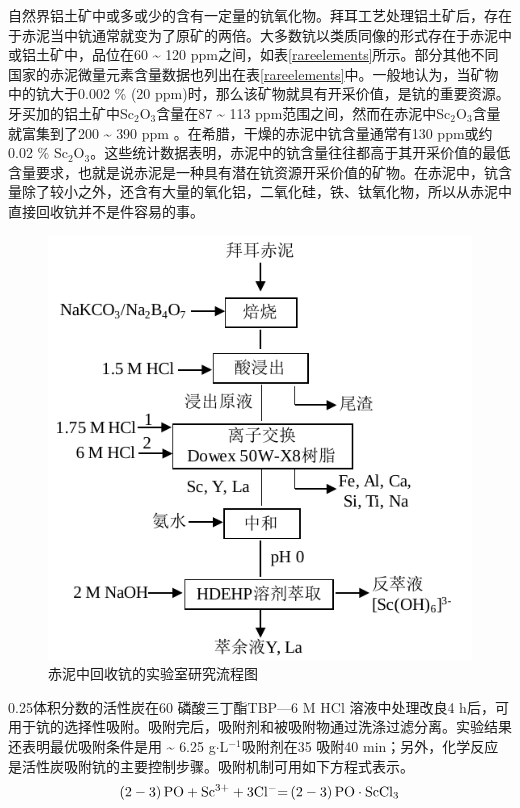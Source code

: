 自然界铝土矿中或多或少的含有一定量的钪氧化物。拜耳工艺处理铝土矿后，存在于赤泥当中钪通常就变为了原矿的两倍\cite{ochsenkuhn1994direct}。大多数钪以类质同像的形式存在于赤泥中或铝土矿中\cite{xiao1996distribution,Chi1993scandium}，品位在60 \textasciitilde{ }120 ppm之间，如表\ref{rareelements}所示\cite{smirnov1997investigation,samouhos2013greek,xiao1996distribution,ochsenkuhn2002pilot,wang2013recovery,sinha2014extraction}。部分其他不同国家的赤泥微量元素含量数据也列出在表\ref{rareelements}中。一般地认为，当矿物中的钪大于0.002 \% (20 ppm)时，那么该矿物就具有开采价值，是钪的重要资源\cite{shaoquan1996review}。牙买加的铝土矿中Sc$ _{\mathrm{2}} $O$ _{\mathrm{3}} $含量在87 \textasciitilde{ }113 ppm范围之间，然而在赤泥中Sc$ _{\mathrm{2}} $O$ _{\mathrm{3}} $含量就富集到了200 \textasciitilde{ }390 ppm \cite{wagh1987occurrence}。在希腊，干燥的赤泥中钪含量通常有130 ppm或约0.02 \% Sc$ _{\mathrm{2}} $O$ _{\mathrm{3}} $\cite{ochsenkuhn1994direct}。这些统计数据表明，赤泥中的钪含量往往都高于其开采价值的最低含量要求，也就是说赤泥是一种具有潜在钪资源开采价值的矿物。在赤泥中，钪含量除了较小之外，还含有大量的氧化铝，二氧化硅，铁、钛氧化物，所以从赤泥中直接回收钪并不是件容易的事。
\begin{figure}[!h]
	\centering
	\includegraphics[width=0.65\linewidth]{Figures/c1/Figure11}%
	\caption{赤泥中回收钪的实验室研究流程图}\label{recoveringSc}
\end{figure}

0.25体积分数的活性炭在60 \textcelsius 磷酸三丁酯TBP—6 M HCl 溶液中处理改良4 h后，可用于钪的选择性吸附\cite{hualei2008extraction}。吸附完后，吸附剂和被吸附物通过洗涤过滤分离。实验结果还表明最优吸附条件是用 \textasciitilde{ }6.25 g$ \cdot $L$ ^{\mathrm{-1}} $吸附剂在35 \textcelsius 吸附40 min；另外，化学反应是活性炭吸附钪的主要控制步骤。吸附机制可用如下方程式表示\cite{hualei2008extraction}。
\begin{equation}
\left( {{\rm{2}} - {\rm{3}}} \right){\rm{PO}} + {\rm{S}}{{\rm{c}}^{{\rm{3 + }}}} + {\rm{3}}{\rm{C}}{{\rm{l}}^ - }{\rm{  =  }}\left( {{\rm{2}} - {\rm{3}}} \right){\rm{PO}} \cdot {\rm{ScC}}{{\rm{l}}_{\rm{3}}}
\end{equation}

